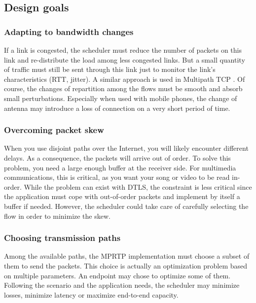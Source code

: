 \subsection{Design goals}

\subsubsection{Adapting to bandwidth changes}

If a link is congested, the scheduler must reduce the number of packets on this link and re-distribute the load among less congested links. But a small quantity of traffic must still be sent through this link just to monitor the link's characteristics (RTT, jitter). A similar approach is used in Multipath TCP \cite{wischik2011design}. Of course, the changes of repartition among the flows must be smooth and absorb small perturbations. Especially when used with mobile phones, the change of antenna may introduce a loss of connection on a very short period of time.

\subsubsection{Overcoming packet skew}

When you use disjoint paths over the Internet, you will likely encounter different delays. As a consequence, the packets will arrive out of order. To solve this problem, you need a large enough buffer at the receiver side. For multimedia communications, this is critical, as you want your song or video to be read in-order. While the problem can exist with DTLS, the constraint is less critical since the application must cope with out-of-order packets and implement by itself a buffer if needed. However, the scheduler could take care of carefully selecting the flow in order to minimize the skew.

\subsubsection{Choosing transmission paths}

Among the available paths, the MPRTP implementation must choose a subset of them to send the packets. This choice is actually an optimization problem based on multiple parameters. An endpoint may chose to optimize some of them. Following the scenario and the application needs, the scheduler may minimize losses, minimize latency or maximize end-to-end capacity.

